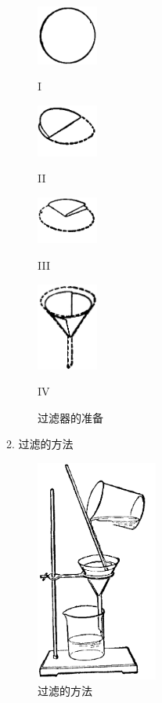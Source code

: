 \begin{figure}[htbp]
    \centering
    \begin{minipage}[b]{3cm}
        \centering
        \includegraphics[width=2cm]{../pic/czhx1-xssy-09-1}
        \caption*{I}
    \end{minipage}
    \qquad
    \begin{minipage}[b]{3cm}
        \centering
        \includegraphics[width=2cm]{../pic/czhx1-xssy-09-2}
        \caption*{II}
    \end{minipage}
    \qquad
    \begin{minipage}[b]{3cm}
        \centering
        \includegraphics[width=2cm]{../pic/czhx1-xssy-09-3}
        \caption*{III}
    \end{minipage}
    \begin{minipage}[b]{3cm}
        \centering
        \includegraphics[width=2cm]{../pic/czhx1-xssy-09-4}
        \caption*{IV}
    \end{minipage}
    \caption{过滤器的准备}\label{fig:xssy-9}
\end{figure}


2. 过滤的方法

\begin{figure}
    \centering
    \includegraphics[width=4cm]{../pic/czhx1-xssy-10}
    \caption{过滤的方法}\label{fig:xssy-10}
\end{figure}

